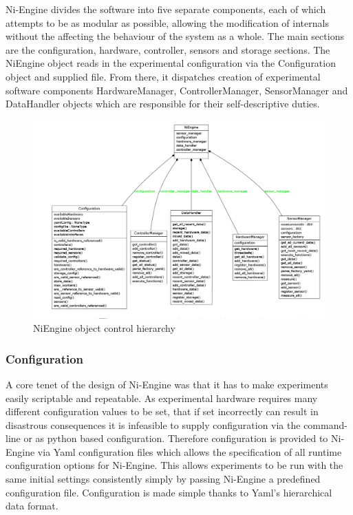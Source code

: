 Ni-Engine divides the software into five separate components, each of which attempts to be as modular as possible, allowing the modification of internals without the affecting the behaviour of the system as a whole. The main sections are the configuration, hardware, controller, sensors and storage sections. The NiEngine object reads in the experimental configuration via the Configuration object and supplied file. From there, it dispatches creation of experimental software components HardwareManager, ControllerManager, SensorManager and DataHandler objects which are responsible for their self-descriptive duties.

\begin{figure}[ht!]
\centering
\includegraphics[width=\textwidth]{Figures/NiEngine.png}
\caption{NiEngine object control hierarchy}
\label{fig:NiEngine}
\end{figure}
\subsubsection{Configuration}
A core tenet of the design of Ni-Engine was that it has to make experiments easily scriptable and repeatable. As experimental hardware requires many different configuration values to be set, that if set incorrectly can result in disastrous consequences it is infeasible to supply configuration via the command-line or as python based configuration. Therefore configuration is provided to Ni-Engine via Yaml configuration files which allows the specification of all runtime configuration options for Ni-Engine. This allows experiments to be run with the same initial settings consistently simply by passing Ni-Engine a predefined configuration file. Configuration is made simple thanks to Yaml's hierarchical data format. 
